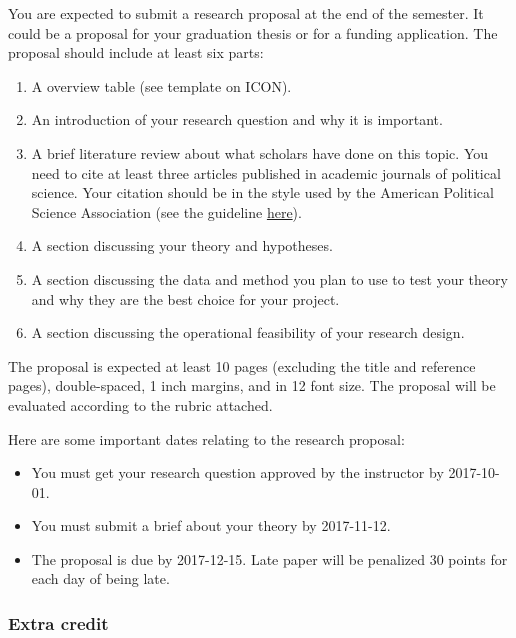 \documentclass[11pt,]{article}
\providecommand{\tightlist}{%
  \setlength{\itemsep}{0pt}\setlength{\parskip}{0pt}}
\theoremstyle{definition}
\theoremstyle{definition}
\theoremstyle{remark}
\begin{document}
You are expected to submit a research proposal at the end of the
semester. It could be a proposal for your graduation thesis or for a
funding application. The proposal should include at least six parts:

\begin{enumerate}
\def\labelenumi{\arabic{enumi}.}
\tightlist
\item
  A overview table (see template on ICON).
\item
  An introduction of your research question and why it is important.
\item
  A brief literature review about what scholars have done on this topic.
  You need to cite at least three articles published in academic
  journals of political science. Your citation should be in the style
  used by the American Political Science Association (see the guideline
  \href{http://www.apsanet.org/portals/54/Files/Publications/APSAStyleManual2006.pdf}{here}).
\item
  A section discussing your theory and hypotheses.
\item
  A section discussing the data and method you plan to use to test your
  theory and why they are the best choice for your project.
\item
  A section discussing the operational feasibility of your research
  design.
\end{enumerate}

The proposal is expected at least 10 pages (excluding the title and
reference pages), double-spaced, 1 inch margins, and in 12 font size.
The proposal will be evaluated according to the rubric attached.

Here are some important dates relating to the research proposal:

\begin{itemize}
\tightlist
\item
  You must get your research question approved by the instructor by
  2017-10-01.
\item
  You must submit a brief about your theory by 2017-11-12.
\item
  The proposal is due by 2017-12-15. Late paper will be penalized 30
  points for each day of being late.
\end{itemize}

\subsubsection{Extra credit}\label{extra-credit}
\end{document}
